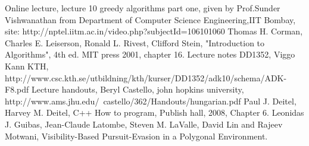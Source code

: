 \begin{thebibliography}{99}
 Online lecture, lecture 10 greedy algorithms part one, given by Prof.Sunder Vishwanathan from Department of Computer Science Engineering,IIT Bombay, site: http://nptel.iitm.ac.in/video.php?subjectId=106101060
Thomas H. Corman, Charles E. Leiserson, Ronald L. Rivest, Clifford Stein, "Introduction to Algorithms", 4th ed. MIT press 2001, chapter 16.
Lecture notes DD1352, Viggo Kann KTH, http://www.csc.kth.se/utbildning/kth/kurser/DD1352/adk10/schema/ADK-F8.pdf
Lecture handouts, Beryl Castello, john hopkins university, http://www.ams.jhu.edu/~castello/362/Handouts/hungarian.pdf
 Paul J. Deitel, Harvey M. Deitel, C++ How to program, Publish hall, 2008, Chapter 6.
 Leonidas J. Guibas, Jean-Claude Latombe, Steven M. LaValle, David Lin and Rajeev Motwani, Visibility-Based Pursuit-Evasion in a Polygonal Environment.

\end{thebibliography}
